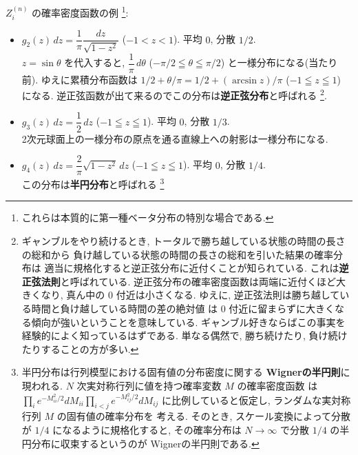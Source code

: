 \documentclass[12pt,twoside]{jarticle}
\theoremstyle{jplain}
\theoremstyle{jplain}
\theoremstyle{jplain}
\numberwithin{theorem}{section}
\numberwithin{equation}{section}
\numberwithin{figure}{section}
\numberwithin{table}{section}
\begin{document}
$Z^{(n)}_i$ の確率密度函数の例%
\footnote{これらは本質的に第一種ベータ分布の特別な場合である.}:
\begin{itemize}

\item $g_2(z)\,dz = \dfrac{1}{\pi}\dfrac{dz}{\sqrt{1-z^2}}$ \;\;\;\quad ($-1<z<1$).
\qquad 平均 $0$, 分散 $1/2$.
\\[\smallskipamount]
$z=\sin\theta$ を代入すると,
$\dfrac{1}{\pi}\,d\theta$ ($-\pi/2\leqq\theta\leqq\pi/2$) と一様分布になる(当たり前).
ゆえに累積分布函数は $1/2+\theta/\pi=1/2+(\arcsin z)/\pi$ ($-1\leqq z\leqq 1$) になる.
逆正弦函数が出て来るのでこの分布は{\bfseries 逆正弦分布}と呼ばれる%
\footnote{\label{fn:arcsin}%
ギャンブルをやり続けるとき,
トータルで勝ち越している状態の時間の長さの総和から
負け越している状態の時間の長さの総和を引いた結果の確率分布は
適当に規格化すると逆正弦分布に近付くことが知られている.
これは{\bfseries 逆正弦法則}と呼ばれている.
逆正弦分布の確率密度函数は両端に近付くほど大きくなり,
真ん中の $0$ 付近は小さくなる.
ゆえに, 逆正弦法則は勝ち越している時間と負け越している時間の差の絶対値
は $0$ 付近に留まらずに大きくなる傾向が強いということを意味している.
ギャンブル好きならばこの事実を経験的によく知っているはずである.
単なる偶然で, 勝ち続けたり, 負け続けたりすることの方が多い.
}.

\item $g_3(z)\,dz = \dfrac{1}{2}\,dz$ \;\;\qquad\qquad ($-1\leqq z\leqq 1$).
\qquad 平均 $0$, 分散 $1/3$.
\\[\smallskipamount]
2次元球面上の一様分布の原点を通る直線上への射影は一様分布になる.

\item $g_4(z)\,dz = \dfrac{2}{\pi}\sqrt{1-z^2}\,dz$ \quad ($-1\leqq z\leqq 1$).
\qquad 平均 $0$, 分散 $1/4$.
\\[\smallskipamount]
この分布は{\bfseries 半円分布}と呼ばれる%
\footnote{\label{fn:Wigner}%
半円分布は行列模型における固有値の分布密度に関する
{\bfseries Wignerの半円則}に現われる.
$N$ 次実対称行列に値を持つ確率変数 $M$ の確率密度函数
は $\prod_i e^{-M_{ii}^2/2}dM_{ii} \prod_{i<j}e^{-M_{ij}^2/2}dM_{ij}$
に比例していると仮定し, ランダムな実対称行列 $M$ の固有値の確率分布を
考える. そのとき, スケール変換によって分散が $1/4$ になるように規格化すると,
その確率分布は $N\to\infty$ で分散 $1/4$ の半円分布に収束するというのが
Wignerの半円則である.

}
\end{itemize}
\end{document}

